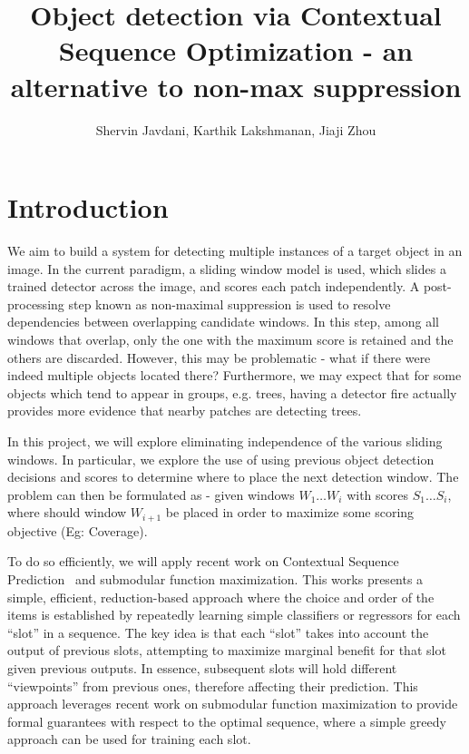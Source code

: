\documentclass[11pt]{article}
\title{ \bf
Object detection via Contextual Sequence Optimization - an alternative to non-max suppression
}
\date{}
\author{Shervin Javdani, Karthik Lakshmanan, Jiaji Zhou}
\begin{document}
\maketitle

\vspace{-15mm}

\section{Introduction}
We aim to build a system for detecting multiple instances of a target object in an image. In the current paradigm, a sliding window model is used, which slides a trained detector across the image, and scores each patch independently. A post-processing step known as non-maximal suppression is used to resolve dependencies between overlapping candidate windows. In this step, among all windows that overlap, only the one with the maximum score is retained and the others are discarded. However, this may be problematic - what if there were indeed multiple objects located there? Furthermore, we may expect that for some objects which tend to appear in groups, e.g. trees, having a detector fire actually provides more evidence that nearby patches are detecting trees. 

In this project, we will explore eliminating independence of the various sliding windows. In particular, we explore the use of using previous object detection decisions and scores to determine where to place the next detection window. The problem can then be formulated as - given windows $W_1 \ldots W_i$ with scores $S_1 \ldots S_i$, where should window $W_{i+1}$ be placed in order to maximize some scoring objective (Eg: Coverage). 

To do so efficiently, we will apply recent work on Contextual Sequence Prediction~\cite{dey_2012_conseqopt} and submodular function maximization. This works presents a simple, efficient, reduction-based approach where the choice and order of the items is established by repeatedly learning simple classifiers or regressors for each “slot” in a sequence. The key idea is that each “slot” takes into account the output of previous slots, attempting to maximize marginal benefit for that slot given previous outputs. In essence, subsequent slots will hold different “viewpoints”  from previous ones, therefore affecting their prediction. This approach leverages recent work on submodular function maximization to provide formal guarantees with respect to the optimal sequence, where a simple greedy approach can be used for training each slot.
\end{document}
